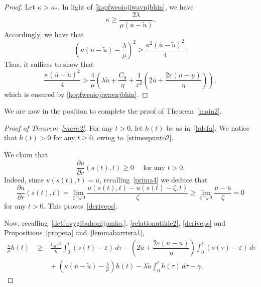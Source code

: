 \documentclass[12pt,a4paper,intlimits,sumlimits]{amsart}
\theoremstyle{definition}
\theoremstyle{plain}
\numberwithin{equation}{section}
\renewcommand{\ge}{\geqslant}
\begin{document}
\begin{proof}
Let $\kappa>\kappa_*$.
In light of \eqref{kopfweoiojiwavnjbhin}, we have 
\[
\kappa\ge\dfrac{2\lambda}{\mu(\overline u-\widetilde u)}.
\]
Accordingly, we have that
\[
\left(\kappa(\overline{u}-\widetilde u)-\frac{\lambda}{\mu}\right)^2\ge\dfrac{\kappa^2(\overline{u}-\widetilde u)^2}{4}.
\]
Thus, it suffices to show that
\[
\dfrac{\kappa(\overline{u}-\widetilde u)^2}{4}>\frac{4}{\mu}\left(\lambda\widetilde u +\dfrac{C_0}{\eta}+\frac{1}{\varepsilon^2}\left(2\overline u +\dfrac{2\varepsilon(\overline u -\underline u)}{\eta} \right)\right),
\]
which is ensured by \eqref{kopfweoiojiwavnjbhin}.
\end{proof}

We are now in the position to complete the proof of Theorem~\ref{main2}.

\begin{proof}[Proof of Theorem~\ref{main2}]
For any $t>0$, let $h(t)$ be as in~\eqref{hdefn}. We notice that $h(t)>0$ for any $t\ge 0$, owing to~\eqref{stimespunto2}.

We claim that
\begin{equation}\label{deriveps}
\frac{\partial u}{\partial r}(s(t),t)\ge 0\quad\mbox{ for any } t>0.
\end{equation}
Indeed,  since $u(s(t), t)= \overline{u}$, recalling~\eqref{prima4} we deduce that
\[
\frac{\partial u}{\partial r}(s(t),t) = \lim_{\zeta\searrow0}\dfrac{u(s(t), t)-u(s(t)-\zeta, t)}{\zeta}\ge\lim_{\zeta\searrow0}\dfrac{\overline{u} -\overline{u}}{\zeta} =0
\]
for any $t>0$. This proves~\eqref{deriveps}.

Now, recalling~\eqref{dctfuvygibuhonijpmko,}, \eqref{relationutilde2}, \eqref{deriveps} and Propositions~\ref{propeta}
and~\ref{lemmabarriera1},
\begin{equation}\label{OjslqwdmedfX3qwoeirf30eprvf}
\begin{split}
\frac{\kappa}{\mu}\dot h(t)&\ge -\frac{C_0\,\varepsilon^2}{\eta}\int_0^t (s(t)-\varepsilon)\,d\tau -\left(2\overline u +\dfrac{2\varepsilon(\overline u -\underline u)}{\eta} \right) \int_0^t (s(\tau)-\varepsilon) \,d\tau\\
&\qquad+\left(\kappa(\overline{u}-\widetilde u)-\frac{\lambda}{\mu}\right)h(t)-\lambda\widetilde u \int_0^t h(\tau)\,d\tau-\overline\gamma.
\end{split}
\end{equation}


\end{proof}
\end{document}
